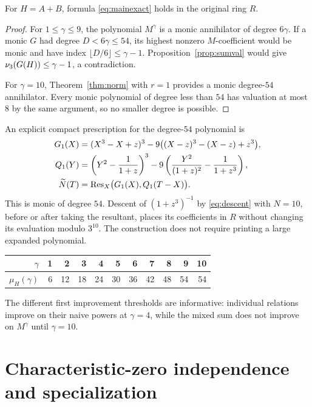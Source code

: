 \begin{theorem}\label{thm:sumexact}
For $H=A+B$, formula \eqref{eq:mainexact} holds in the original ring $R$.
\end{theorem}
\begin{proof}
For $1\le\gamma\le9$, the polynomial $M^\gamma$ is a monic
annihilator of degree $6\gamma$. If a monic $G$ had degree
$D<6\gamma\le54$, its highest nonzero $M$-coefficient would be monic
and have index $\lfloor D/6\rfloor\le\gamma-1$.
Proposition~\ref{prop:sumval} would give
$\nu_3(G(H))\le\gamma-1$, a contradiction.

For $\gamma=10$, Theorem~\ref{thm:norm} with $r=1$ provides a monic
degree-$54$ annihilator. Every monic polynomial of degree less than
$54$ has valuation at most $8$ by the same argument, so no smaller
degree is possible.
\end{proof}

An explicit compact prescription for the degree-$54$ polynomial is
\begin{align*}
 G_1(X)&=(X^3-X+z)^3
             -9\bigl((X-z)^3-(X-z)+z^3\bigr),\\
 Q_1(Y)&=\left(Y^2-\frac1{1+z}\right)^3
             -9\left(\frac{Y^2}{(1+z)^2}-\frac1{1+z^3}\right),\\
 \widetilde N(T)&=\operatorname{Res}_X\bigl(G_1(X),Q_1(T-X)\bigr).
\end{align*}
This is monic of degree $54$. Descent of $(1+z^3)^{-1}$ by
\eqref{eq:descent} with $N=10$, before or after taking the resultant,
places its coefficients in $R$ without changing its evaluation modulo
$3^{10}$. The construction does not require printing a large expanded
polynomial.

\begin{center}
\begin{tabular}{rrrrrrrrrrr}
\toprule
$\gamma$&1&2&3&4&5&6&7&8&9&10\\
\midrule
$\mu_H(\gamma)$&6&12&18&24&30&36&42&48&54&54\\
\bottomrule
\end{tabular}
\end{center}
The different first improvement thresholds are informative: individual
relations improve on their naive powers at $\gamma=4$, while the
mixed sum does not improve on $M^\gamma$ until $\gamma=10$.

\section{Characteristic-zero independence and specialization}
\label{sec:independence}

